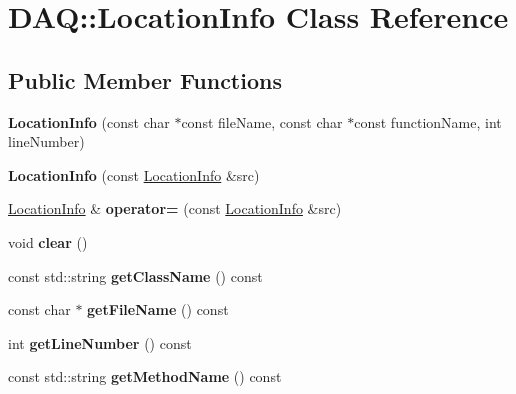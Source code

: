 \hypertarget{classDAQ_1_1LocationInfo}{}\section{D\+AQ\+:\+:Location\+Info Class Reference}
\label{classDAQ_1_1LocationInfo}
\subsection*{Public Member Functions}
\begin{DoxyCompactItemize}
\item 
\mbox{\label{classDAQ_1_1LocationInfo_ad8fd3ddaaef34f5805ac45dbf8372d97}} 
{\bfseries Location\+Info} (const char $\ast$const file\+Name, const char $\ast$const function\+Name, int line\+Number)
\item 
\mbox{\label{classDAQ_1_1LocationInfo_af38bf6a76e6bfc50bf39065ac20dc3ec}} 
{\bfseries Location\+Info} (const \hyperlink{classDAQ_1_1LocationInfo}{Location\+Info} \&src)
\item 
\mbox{\label{classDAQ_1_1LocationInfo_ab2ec9c7bb94e829274d06573a726edd0}} 
\hyperlink{classDAQ_1_1LocationInfo}{Location\+Info} \& {\bfseries operator=} (const \hyperlink{classDAQ_1_1LocationInfo}{Location\+Info} \&src)
\item 
\mbox{\label{classDAQ_1_1LocationInfo_a32dce8810511176daa2f196320ac127e}} 
void {\bfseries clear} ()
\item 
\mbox{\label{classDAQ_1_1LocationInfo_aa8f3915d3ec66601ed925b688ac24ef3}} 
const std\+::string {\bfseries get\+Class\+Name} () const
\item 
\mbox{\label{classDAQ_1_1LocationInfo_ac2756889315072a901af21fc7d907433}} 
const char $\ast$ {\bfseries get\+File\+Name} () const
\item 
\mbox{\label{classDAQ_1_1LocationInfo_a99a93f3293e5a8e23419c36cd87e75b9}} 
int {\bfseries get\+Line\+Number} () const
\item 
\mbox{\label{classDAQ_1_1LocationInfo_a959557ef3e6b37c09be1194bef5a13ac}} 
const std\+::string {\bfseries get\+Method\+Name} () const
\end{DoxyCompactItemize}
